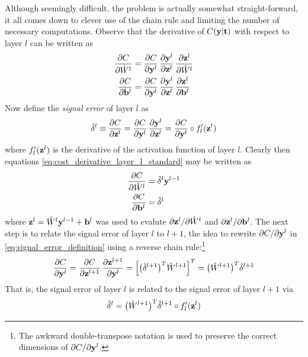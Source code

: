 \documentclass[nofootinbib,reprint,english]{revtex4-1}
\begin{document}
Although seemingly difficult, the problem is actually somewhat straight-forward, it all comes down to clever use of the chain rule and limiting the number of necessary computations. Observe that the derivative of \(C(\vb{y}|\vb{t})\) with respect to layer \(l\) can be written as
\begin{subequations}\label{eq:cost_derivative_layer_l_standard}
\begin{align}
\pdv{C}{\hat{W}^l}&=\pdv{C}{\vb{y}^l}\,\pdv{\vb{y}^l}{\vb{z}^l}\,\pdv{\vb{z}^l}{\hat{W}^l}\\
\pdv{C}{\vb{b}^l}&=\pdv{C}{\vb{y}^l}\,\pdv{\vb{y}^l}{\vb{z}^l}\,\pdv{\vb{z}^l}{\vb{b}^l}
\end{align}
\end{subequations}
Now define the \emph{signal error} of layer \(l\) as
\begin{equation}\label{eq:signal_error_definition}
\hat{\delta}^l\equiv\pdv{C}{\vb{z}^l}=\pdv{C}{\vb{y}^l}\,\pdv{\vb{y}^l}{\vb{z}^l}=\pdv{C}{\vb{y}^l}\circ f'_l(\vb{z}^l)
\end{equation}
where \(f'_l(\vb{z}^l)\) is the derivative of the activation function of layer \(l\). Clearly then equations \eqref{eq:cost_derivative_layer_l_standard} may be written as
\begin{subequations}\label{eq:cost_derivative_layer_l}
\begin{align}
\pdv{C}{\hat{W}^l}&=\hat{\delta}^l\vb{y}^{l-1}\\
\pdv{C}{\vb{b}^l}&=\hat{\delta}^l
\end{align}
\end{subequations}
where \(\vb{z}^l=\hat{W}^l\vb{y}^{l-1}+\vb{b}^l\) was used to evalute \(\partial\vb{z}^l/\partial\hat{W}^l\) and \(\partial\vb{z}^l/\partial\vb{b}^l\). The next step is to relate the signal error of layer \(l\) to \(l+1\), the idea to rewrite \(\partial C/\partial\vb{y}^l\) in \eqref{eq:signal_error_definition} using a reverse chain rule:\footnote{The awkward double-transpose notation is used to preserve the correct dimensions of \(\partial C/\partial\vb{y}^l\).}
\[\pdv{C}{\vb{y}^l}=\pdv{C}{\vb{z}^{l+1}}\,\pdv{\vb{z}^{l+1}}{\vb{y}^l}=\Big[\big(\hat{\delta}^{l+1}\big)^T\hat{W}^{l+1}\Big]^T=\big(\hat{W}^{l+1}\big)^T\hat{\delta}^{l+1}\]
That is, the signal error of layer \(l\) is related to the signal error of layer \(l+1\) via
\begin{equation}\label{eq:signal_error_recursive_relation}
\hat{\delta}^l=\big(\hat{W}^{l+1}\big)^T\hat{\delta}^{l+1}\circ f'_l(\vb{z}^l)
\end{equation}
\end{document}
